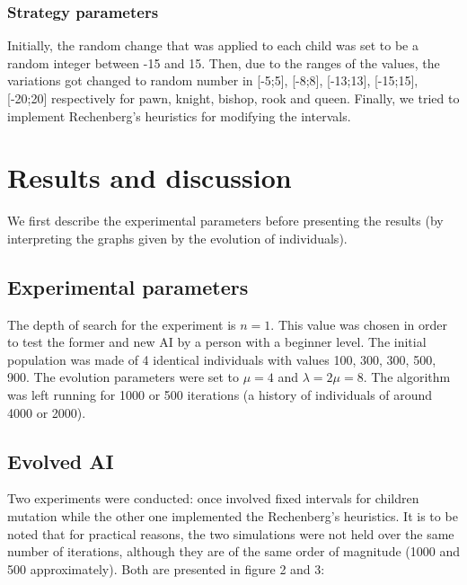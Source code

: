 \documentclass[11pt,a4paper,twocolumn]{article}
\begin{document}
\subsubsection{Strategy parameters}
Initially, the random change that was applied to each child was set to be a random integer between -15 and 15. Then, due to the ranges of the values, the variations got changed to random number in [-5;5], [-8;8], [-13;13], [-15;15], [-20;20] respectively for pawn, knight, bishop, rook and queen. Finally, we tried to implement Rechenberg's heuristics for modifying the intervals.

\section{Results and discussion}
We first describe the experimental parameters before presenting the results (by interpreting the graphs given by the evolution of individuals).

\subsection{Experimental parameters}
The depth of search for the experiment is $n = 1$. This value was chosen in order to test the former and new AI by a person with a beginner level. The initial population was made of 4 identical individuals with values 100, 300, 300, 500, 900. The evolution parameters were set to $\mu = 4$ and $\lambda = 2\mu = 8$. The algorithm was left running for 1000 or 500 iterations (a history of individuals of around 4000 or 2000).

\subsection{Evolved AI}
Two experiments were conducted: once involved fixed intervals for children mutation while the other one implemented the Rechenberg's heuristics. It is to be noted that for practical reasons, the two simulations were not held over the same number of iterations, although they are of the same order of magnitude (1000 and 500 approximately). Both are presented in figure 2 and 3:
\end{document}
